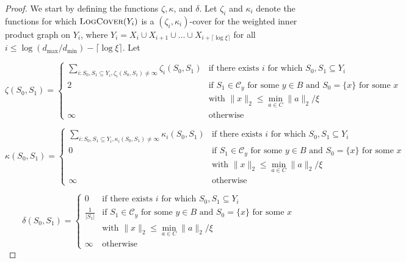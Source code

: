 \begin{proof}
We start by defining the functions $\zeta,\kappa$, and $\delta$. Let $\zeta_i$ and $\kappa_i$ denote the functions for which $\textsc{LogCover}(Y_i)$ is a $(\zeta_i,\kappa_i)$-cover for the weighted inner product graph on $Y_i$, where $Y_i = X_i\cup X_{i+1}\cup \hdots\cup X_{i+\lceil \log \xi \rceil}$ for all $i\le \log(d_{\max}/d_{\min}) - \lceil \log \xi \rceil$. Let

\[
  \zeta(S_0,S_1) =
  \begin{cases}
                                   \sum_{i: S_0,S_1\subseteq Y_i, \zeta_i(S_0,S_1)\ne \infty} \zeta_i(S_0,S_1) & \text{if there exists $i$ for which $S_0,S_1\subseteq Y_i$} \\
                                   2 & \text{if $S_1\in \mathcal C_y$ for some $y\in B$ and $S_0 = \{x\}$ for some $x$}\\
                                   & \text{with $\|x\|_2\le \min_{a\in C} \|a\|_2/\xi$} \\
                                    \infty & \text{otherwise}
  \end{cases}
\]

\[
  \kappa(S_0,S_1) =
  \begin{cases}
                                   \sum_{i: S_0,S_1\subseteq Y_i, \kappa_i(S_0,S_1)\ne \infty} \kappa_i(S_0,S_1) & \text{if there exists $i$ for which $S_0,S_1\subseteq Y_i$} \\
                                   0 & \text{if $S_1\in \mathcal C_y$ for some $y\in B$ and $S_0 = \{x\}$ for some $x$}\\
                                   & \text{with $\|x\|_2\le \min_{a\in C} \|a\|_2/\xi$} \\
                                    \infty & \text{otherwise}
  \end{cases}
\]

\[
  \delta(S_0,S_1) =
  \begin{cases}
                                   0 & \text{if there exists $i$ for which $S_0,S_1\subseteq Y_i$} \\
                                   \frac{1}{|S_1|} & \text{if $S_1\in \mathcal C_y$ for some $y\in B$ and $S_0 = \{x\}$ for some $x$}\\
                                   & \text{with $\|x\|_2\le \min_{a\in C} \|a\|_2/\xi$} \\
                                    \infty & \text{otherwise}
  \end{cases}
\]


\end{proof}
